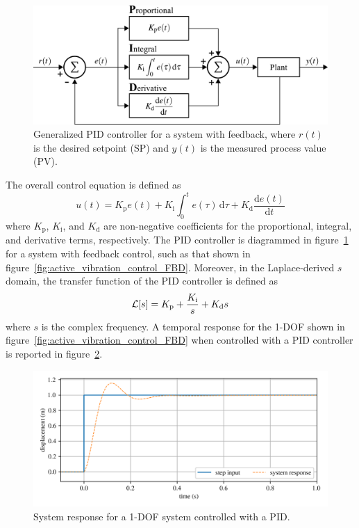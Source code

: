 \documentclass[12pt,letter]{article}
\begin{document}
\begin{figure}[H]
	\centering
	\includegraphics[]{../figures/PID_controller.png}
	\caption{Generalized PID controller for a system with feedback, where $r(t)$ is the desired setpoint (SP) and $y(t)$ is the measured process value (PV).}
	\label{fig:PID_controller}
\end{figure}

The overall control equation is defined as
\begin{equation}
	u(t) = K_\text{p} e(t) + K_\text{i} \int_0^t e(\tau) \,\mathrm{d}\tau + K_\text{d} \frac{\mathrm{d}e(t)}{\mathrm{d}t}
\end{equation}
where $K_\text{p}$, $K_\text{i}$, and $K_\text{d}$ are non-negative coefficients for the proportional, integral, and derivative terms, respectively. The PID controller is diagrammed in figure~\ref{fig:PID_controller} for a system with feedback control, such as that shown in figure~\ref{fig:active_vibration_control_FBD}. Moreover, in the Laplace-derived $s$ domain, the transfer function of the PID controller is defined as
\begin{equation}
	\mathcal{L}{\left[s\right]} = K_\text{p} + \frac{K_\text{i}}{s} + K_\text{d}s
\end{equation}
where $s$ is the complex frequency. A temporal response for the 1-DOF shown in figure~\ref{fig:active_vibration_control_FBD} when controlled with a PID controller is reported in figure~\ref{fig:PID_temporal_response_1}.

\begin{figure}[H]
	\centering
	\includegraphics[]{../figures/PID_temporal_response_1.png}
	\caption{System response for a 1-DOF system controlled with a PID.}
	\label{fig:PID_temporal_response_1}
\end{figure}
\end{document}

